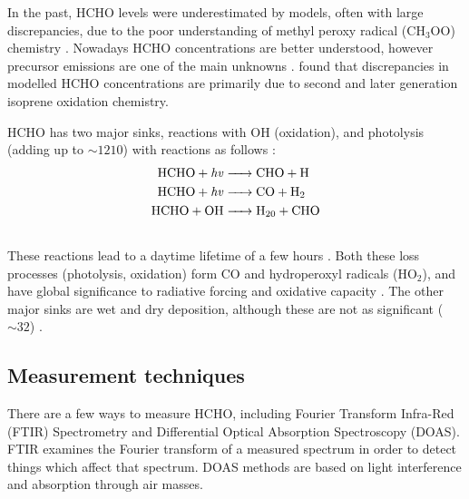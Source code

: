     In the past, HCHO levels were underestimated by models, often with large discrepancies, due to the poor understanding of methyl peroxy radical (CH$_3$OO) chemistry \parencite{Wagner2002}.
    Nowadays HCHO concentrations are better understood, however precursor emissions are one of the main unknowns \parencite[eg.][]{Emmerson2016,Marvin2017}.
    \textcite{Marvin2017} found that discrepancies in modelled HCHO concentrations are primarily due to second and later generation isoprene oxidation chemistry.
    
    HCHO has two major sinks, reactions with OH (oxidation), and photolysis (adding up to $\sim 1210$\tgpyr) \parencite{Levy1972, Crutzen1999, Wagner2002, FortemsCheiney2012, Kefauver2014} with reactions as follows \parencite{Ayers1997}:
    \begin{align*} %
      \label{Model:GC:Mechanisms:eqn_mechanisms}
        \ce{ 
          HCHO + \mathit{hv} -> & CHO + H \\ 
          HCHO + \mathit{hv} -> & CO + H2 \\ 
          HCHO + OH -> & H20 + CHO \\ 
        }
    \end{align*}
    These reactions lead to a daytime lifetime of a few hours \parencite{Atkinson2000, Millet2006}.
    Both these loss processes (photolysis, oxidation) form CO and hydroperoxyl radicals (HO$_2$), and have global significance to radiative forcing and oxidative capacity \parencite{Franco2015}.
    The other major sinks are wet and dry deposition, although these are not as significant ($\sim 32$\tgpyr) \parencite{Atkinson2000,FortemsCheiney2012}.
    
    
  \subsection{Measurement techniques}
    \label{LR:HCHO:Measurements}
    There are a few ways to measure HCHO, including Fourier Transform Infra-Red (FTIR) Spectrometry and Differential Optical Absorption Spectroscopy (DOAS).
    FTIR examines the Fourier transform of a measured spectrum in order to detect things which affect that spectrum.
    DOAS methods are based on light interference and absorption through air masses.
    
